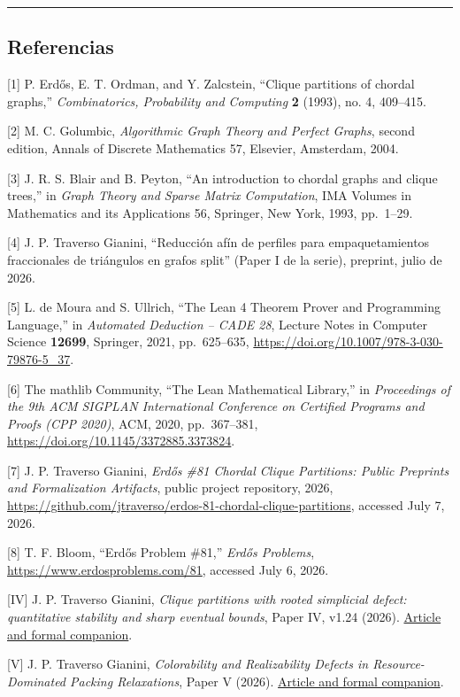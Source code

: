 \documentclass[spanish,11pt,a4paper]{article}
\begin{document}
\begin{center}\rule{0.5\linewidth}{0.5pt}\end{center}

\subsection{Referencias}\label{referencias}

{[}1{]} P. Erdős, E. T. Ordman, and Y. Zalcstein, ``Clique partitions of
chordal graphs,'' \emph{Combinatorics, Probability and Computing}
\textbf{2} (1993), no. 4, 409--415.

{[}2{]} M. C. Golumbic, \emph{Algorithmic Graph Theory and Perfect
Graphs}, second edition, Annals of Discrete Mathematics 57, Elsevier,
Amsterdam, 2004.

{[}3{]} J. R. S. Blair and B. Peyton, ``An introduction to chordal
graphs and clique trees,'' in \emph{Graph Theory and Sparse Matrix
Computation}, IMA Volumes in Mathematics and its Applications 56,
Springer, New York, 1993, pp.~1--29.

{[}4{]} J. P. Traverso Gianini, ``Reducción afín de perfiles para
empaquetamientos fraccionales de triángulos en grafos split'' (Paper I
de la serie), preprint, julio de 2026.

{[}5{]} L. de Moura and S. Ullrich, ``The Lean 4 Theorem Prover and
Programming Language,'' in \emph{Automated Deduction -- CADE 28},
Lecture Notes in Computer Science \textbf{12699}, Springer, 2021,
pp.~625--635, \url{https://doi.org/10.1007/978-3-030-79876-5_37}.

{[}6{]} The mathlib Community, ``The Lean Mathematical Library,'' in
\emph{Proceedings of the 9th ACM SIGPLAN International Conference on
Certified Programs and Proofs (CPP 2020)}, ACM, 2020, pp.~367--381,
\url{https://doi.org/10.1145/3372885.3373824}.

{[}7{]} J. P. Traverso Gianini, \emph{Erdős \#81 Chordal Clique
Partitions: Public Preprints and Formalization Artifacts}, public
project repository, 2026,
\url{https://github.com/jtraverso/erdos-81-chordal-clique-partitions},
accessed July 7, 2026.

{[}8{]} T. F. Bloom, ``Erdős Problem \#81,'' \emph{Erdős Problems},
\url{https://www.erdosproblems.com/81}, accessed July 6, 2026.

{[}IV{]} J. P. Traverso Gianini, \emph{Clique partitions with rooted
simplicial defect: quantitative stability and sharp eventual bounds},
Paper IV, v1.24 (2026).
\href{https://github.com/jtraverso/erdos-81-chordal-clique-partitions/tree/eb335845bfa23375d5040ea31fc4f4b366346287/preprints/PAPER_IV}{Article
and formal companion}.

{[}V{]} J. P. Traverso Gianini, \emph{Colorability and Realizability
Defects in Resource-Dominated Packing Relaxations}, Paper V (2026).
\href{https://github.com/jtraverso/erdos-81-chordal-clique-partitions/tree/eb335845bfa23375d5040ea31fc4f4b366346287/preprints/PAPER_V}{Article
and formal companion}.
\end{document}

